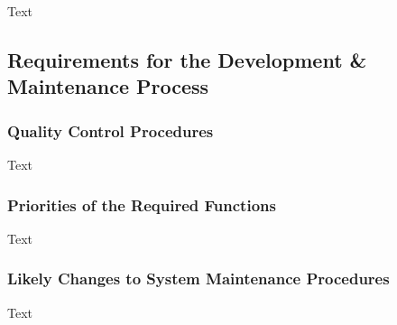 \documentclass[12pt]{article}
\begin{document}
Text

\subsection{Requirements for the Development & Maintenance Process}

\subsubsection {Quality Control Procedures}

Text

\subsubsection {Priorities of the Required Functions}

Text

\subsubsection {Likely Changes to System Maintenance Procedures}

Text
\end{document}
